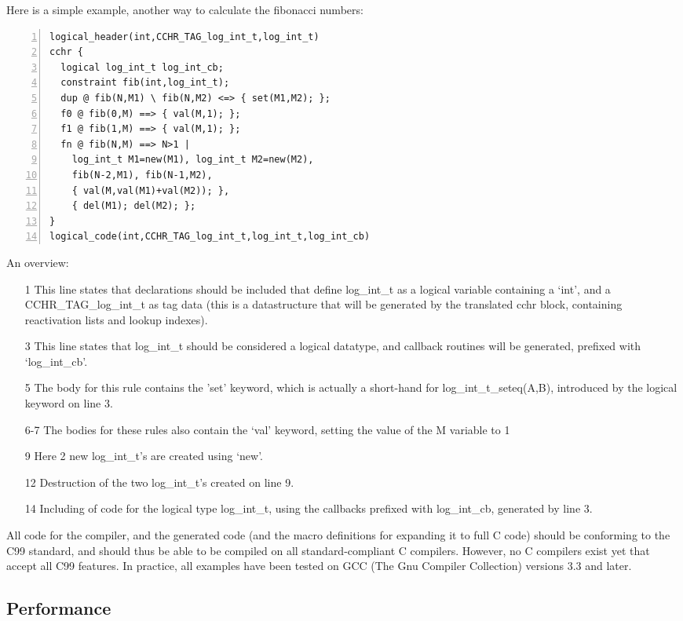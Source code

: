 \documentclass{llncs}
\begin{document}
Here is a simple example, another way to calculate the fibonacci numbers: \begin{Verbatim}[numbers=left]
logical_header(int,CCHR_TAG_log_int_t,log_int_t)
cchr {
  logical log_int_t log_int_cb;
  constraint fib(int,log_int_t);
  dup @ fib(N,M1) \ fib(N,M2) <=> { set(M1,M2); };
  f0 @ fib(0,M) ==> { val(M,1); };
  f1 @ fib(1,M) ==> { val(M,1); };
  fn @ fib(N,M) ==> N>1 |
    log_int_t M1=new(M1), log_int_t M2=new(M2),
    fib(N-2,M1), fib(N-1,M2),
    { val(M,val(M1)+val(M2)); },
    { del(M1); del(M2); };
}
logical_code(int,CCHR_TAG_log_int_t,log_int_t,log_int_cb)
\end{Verbatim}


An overview: \begin{itemize}
  \item[1] This line states that declarations should be included that define log\_int\_t as a logical variable containing a `int', and a CCHR\_TAG\_log\_int\_t as tag data (this is a datastructure that will be generated by the translated cchr block, containing reactivation lists and lookup indexes).
  \item[3] This line states that log\_int\_t should be considered a logical datatype, and callback routines will be generated, prefixed with `log\_int\_cb'.
  \item[5] The body for this rule contains the 'set' keyword, which is actually a short-hand for log\_int\_t\_seteq(A,B), introduced by the logical keyword on line 3.
  \item[6-7] The bodies for these rules also contain the `val' keyword, setting the value of the M variable to 1
  \item[9] Here 2 new log\_int\_t's are created using `new'.
  \item[12] Destruction of the two log\_int\_t's created on line 9.
  \item[14] Including of code for the logical type log\_int\_t, using the callbacks prefixed with log\_int\_cb, generated by line 3.
\end{itemize}

All code for the compiler, and the generated code (and the macro definitions for expanding it to full C code) should be conforming to the C99 standard,
and should thus be able to be compiled on all standard-compliant C compilers. However, no C compilers exist yet that accept
all C99 features. In practice, all examples have been tested on GCC (The Gnu Compiler Collection) versions 3.3 and later.

\subsection{Performance}
\end{document}
